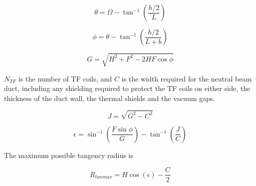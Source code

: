\documentclass[hidelinks]{article}
\numberwithin{equation}{section}
\begin{document}
    \begin{equation}\label{eq: beam-a-theta}
        \theta = \Omega - \tan^{-1} \left ( \frac{h/2}{L} \right)
    \end{equation}

    \begin{equation}\label{eq: beam-a-phi}
        \phi = \theta - \tan^{-1} \left ( \frac{h/2}{L + b}  \right )
    \end{equation}

    \begin{equation}\label{eq: beam-a-g}
        G = \sqrt{H^2 + F^2 -2HF\cos \phi}
    \end{equation}

    \noi $N_{TF}$ is the number of TF coils, and $C$ is the width required for 
    the neutral beam duct, including any shielding required to protect the TF 
    coils on either side, the thickness of the duct wall, the thermal shields 
    and the vacuum gaps.

    \begin{equation}\label{eq: beam-a-j}
        J = \sqrt{G^2 - C^2}
    \end{equation}

    \begin{equation}\label{eq: beam-a-epsilon}
        \epsilon = \sin^{-1} \left ( \frac{F\sin \phi}{G} \right ) - 
        \tan^{-1} \left ( \frac{J}{C} \right )
    \end{equation}

    \noi The maximum possible tangency radius is

    \begin{equation}\label{eq: beam-a-rtan}
        R_{tanmax} = H \cos(\epsilon) - \frac{C}{2}
    \end{equation}

    {}
    
    
    
\end{document}

